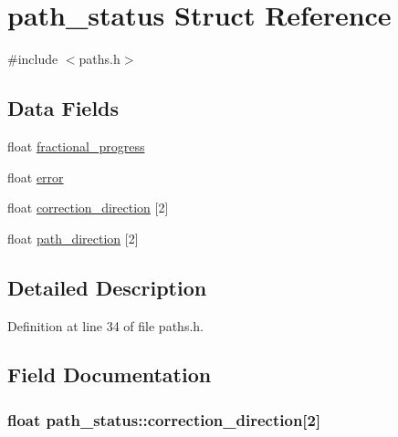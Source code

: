 \hypertarget{structpath__status}{\section{path\-\_\-status Struct Reference}
\label{structpath__status}
}


{\ttfamily \#include $<$paths.\-h$>$}

\subsection*{Data Fields}
\begin{DoxyCompactItemize}
\item 
float \hyperlink{structpath__status_a4ec0ce142eafe131f8e2d45d1771ebd3}{fractional\-\_\-progress}
\item 
float \hyperlink{structpath__status_a673ce13b12050e471c15f386e8193ac7}{error}
\item 
float \hyperlink{structpath__status_a0931fd2d5f90e4103b4096bae764ca86}{correction\-\_\-direction} \mbox{[}2\mbox{]}
\item 
float \hyperlink{structpath__status_ac36e4cfed92a1fe959ba8f45728e4779}{path\-\_\-direction} \mbox{[}2\mbox{]}
\end{DoxyCompactItemize}


\subsection{Detailed Description}


Definition at line 34 of file paths.\-h.



\subsection{Field Documentation}
\hypertarget{structpath__status_a0931fd2d5f90e4103b4096bae764ca86}{
\subsubsection[{correction\-\_\-direction}]{\setlength{\rightskip}{0pt plus 5cm}float path\-\_\-status\-::correction\-\_\-direction\mbox{[}2\mbox{]}}}\label{structpath__status_a0931fd2d5f90e4103b4096bae764ca86}


